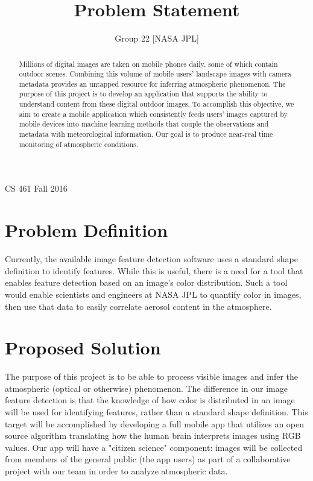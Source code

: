 \documentclass[letterpaper,10pt,draftclsnofoot,onecolumn]{IEEEtran}
\title{Problem Statement}
\author{\name}
\date{Group 22 [NASA JPL]}
\def\course{CS 461 Fall 2016}
\begin{document}
\begin{titlingpage}
\maketitle
\vspace*{10em}
\centering
\course
\vspace*{4em}
\begin{abstract} 
Millions of digital images are taken on mobile phones daily, some of which contain outdoor scenes. Combining this volume of mobile users' landscape images with camera metadata provides an untapped resource for inferring atmospheric phenomenon. The purpose of this project is to develop an application that supports the ability to understand content from these digital outdoor images. To accomplish this objective, we aim to create a mobile application which consistently feeds users' images captured by mobile devices into machine learning methods that couple the observations and metadata with meteorological information. Our goal is to produce near-real time monitoring of atmospheric conditions.
\end{abstract}
\end{titlingpage}
\clearpage
\section{Problem Definition}

Currently, the available image feature detection software uses a standard shape definition to identify features. While this is useful, there is a need for a tool that enables feature detection based on an image's color distribution. Such a tool would enable scientists and engineers at NASA JPL to quantify color in images, then use that data to easily correlate aerosol content in the atmosphere.

\section{Proposed Solution}
The purpose of this project is to be able to process visible images and infer the atmospheric (optical or otherwise) phenomenon. The difference in our image feature detection is that the knowledge of how color is distributed in an image will be used for identifying features, rather than a standard shape definition. This target will be accomplished by developing a full mobile app that utilizes an open source algorithm translating how the human brain interprets images using RGB values. Our app will have a "citizen science" component: images will be collected from members of the general public (the app users) as part of a collaborative project with our team in order to analyze atmospheric data.
\end{document}
